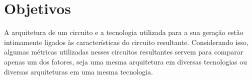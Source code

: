 %
%
%
%
%
%

\section{Objetivos} %

A arquitetura de um circuito e a tecnologia utilizada para a sua geração estão intimamente ligados às características do circuito resultante. Considerando isso, algumas métricas utilizadas nesses circuitos resultantes servem para comparar apenas um dos fatores, seja uma mesma arquitetura em diversas tecnologias ou diversas arquiteturas em uma mesma tecnologia.

